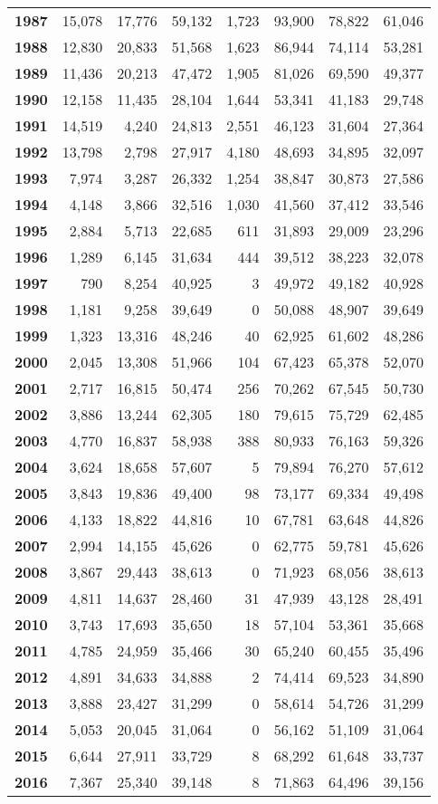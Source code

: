\begin{table}[h]
{\begin{tabular}{@{}>{\bfseries}r r r r r r r r@{}}
1987 & 15,078 & 17,776 & 59,132 & 1,723 & 93,900 & 78,822 & 61,046 \\
1988 & 12,830 & 20,833 & 51,568 & 1,623 & 86,944 & 74,114 & 53,281 \\
1989 & 11,436 & 20,213 & 47,472 & 1,905 & 81,026 & 69,590 & 49,377 \\
1990 & 12,158 & 11,435 & 28,104 & 1,644 & 53,341 & 41,183 & 29,748 \\
1991 & 14,519 & 4,240 & 24,813 & 2,551 & 46,123 & 31,604 & 27,364 \\
1992 & 13,798 & 2,798 & 27,917 & 4,180 & 48,693 & 34,895 & 32,097 \\
1993 & 7,974 & 3,287 & 26,332 & 1,254 & 38,847 & 30,873 & 27,586 \\
1994 & 4,148 & 3,866 & 32,516 & 1,030 & 41,560 & 37,412 & 33,546 \\
1995 & 2,884 & 5,713 & 22,685 & 611 & 31,893 & 29,009 & 23,296 \\
1996 & 1,289 & 6,145 & 31,634 & 444 & 39,512 & 38,223 & 32,078 \\
1997 & 790 & 8,254 & 40,925 & 3 & 49,972 & 49,182 & 40,928 \\
1998 & 1,181 & 9,258 & 39,649 & 0 & 50,088 & 48,907 & 39,649 \\
1999 & 1,323 & 13,316 & 48,246 & 40 & 62,925 & 61,602 & 48,286 \\
2000 & 2,045 & 13,308 & 51,966 & 104 & 67,423 & 65,378 & 52,070 \\
2001 & 2,717 & 16,815 & 50,474 & 256 & 70,262 & 67,545 & 50,730 \\
2002 & 3,886 & 13,244 & 62,305 & 180 & 79,615 & 75,729 & 62,485 \\
2003 & 4,770 & 16,837 & 58,938 & 388 & 80,933 & 76,163 & 59,326 \\
2004 & 3,624 & 18,658 & 57,607 & 5 & 79,894 & 76,270 & 57,612 \\
2005 & 3,843 & 19,836 & 49,400 & 98 & 73,177 & 69,334 & 49,498 \\
2006 & 4,133 & 18,822 & 44,816 & 10 & 67,781 & 63,648 & 44,826 \\
2007 & 2,994 & 14,155 & 45,626 & 0 & 62,775 & 59,781 & 45,626 \\
2008 & 3,867 & 29,443 & 38,613 & 0 & 71,923 & 68,056 & 38,613 \\
2009 & 4,811 & 14,637 & 28,460 & 31 & 47,939 & 43,128 & 28,491 \\
2010 & 3,743 & 17,693 & 35,650 & 18 & 57,104 & 53,361 & 35,668 \\
2011 & 4,785 & 24,959 & 35,466 & 30 & 65,240 & 60,455 & 35,496 \\
2012 & 4,891 & 34,633 & 34,888 & 2 & 74,414 & 69,523 & 34,890 \\
2013 & 3,888 & 23,427 & 31,299 & 0 & 58,614 & 54,726 & 31,299 \\
2014 & 5,053 & 20,045 & 31,064 & 0 & 56,162 & 51,109 & 31,064 \\
2015 & 6,644 & 27,911 & 33,729 & 8 & 68,292 & 61,648 & 33,737 \\
2016 & 7,367 & 25,340 & 39,148 & 8 & 71,863 & 64,496 & 39,156 \\
\bottomrule
\end{tabular}
}
\end{table}
